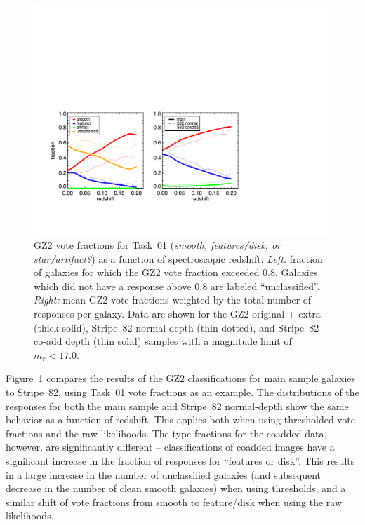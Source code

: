 \documentclass[useAMS,usenatbib]{mn2e}
\begin{document}
\begin{figure}
\includegraphics[angle=0,width=7.0in]{figures/gz2_bias_demo_task01.pdf}
\caption{GZ2 vote fractions for Task~01 ({\it smooth, features/disk, or star/artifact?}) as a function of spectroscopic redshift. {\it Left:} fraction of galaxies for which the GZ2 vote fraction exceeded 0.8. Galaxies which did not have a response above 0.8 are labeled ``unclassified''. {\it Right:} mean GZ2 vote fractions weighted by the total number of responses per galaxy. Data are shown for the GZ2 original + extra (thick solid), Stripe~82 normal-depth (thin dotted), and Stripe~82 co-add depth (thin solid) samples with a magnitude limit of $m_r < 17.0$.
\label{fig-task01}}
\end{figure}

Figure~\ref{fig-task01} compares the results of the GZ2 classifications for main sample galaxies to Stripe~82, using Task~01 vote fractions as an example. The distributions of the responses for both the main sample and Stripe~82 normal-depth show the same behavior as a function of redshift. This applies both when using thresholded vote fractions and the raw likelihoods. The type fractions for the coadded data, however, are significantly different -- classifications of coadded images have a significant increase in the fraction of responses for ``features or disk''. This results in a large increase in the number of unclassified galaxies (and subsequent decrease in the number of clean smooth galaxies) when using thresholds, and a similar shift of vote fractions from smooth to feature/disk when using the raw likelihoods. 
\end{document}
